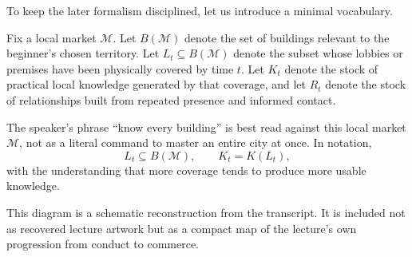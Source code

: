 To keep the later formalism disciplined, let us introduce a minimal vocabulary.

\begin{definition}
Fix a local market \(\mathcal{M}\). Let \(B(\mathcal{M})\) denote the set of buildings relevant to the beginner's chosen territory. Let \(L_t \subseteq B(\mathcal{M})\) denote the subset whose lobbies or premises have been physically covered by time \(t\). Let \(K_t\) denote the stock of practical local knowledge generated by that coverage, and let \(R_t\) denote the stock of relationships built from repeated presence and informed contact.
\end{definition}

The speaker's phrase ``know every building'' is best read against this local market \(\mathcal{M}\), not as a literal command to master an entire city at once. In notation,
\begin{equation}
L_t \subseteq B(\mathcal{M}), \qquad K_t = K(L_t),
\end{equation}
with the understanding that more coverage tends to produce more usable knowledge.

\begin{figure}
\centering
{}
\end{figure}

This diagram is a schematic reconstruction from the transcript. It is included not as recovered lecture artwork but as a compact map of the lecture's own progression from conduct to commerce.

